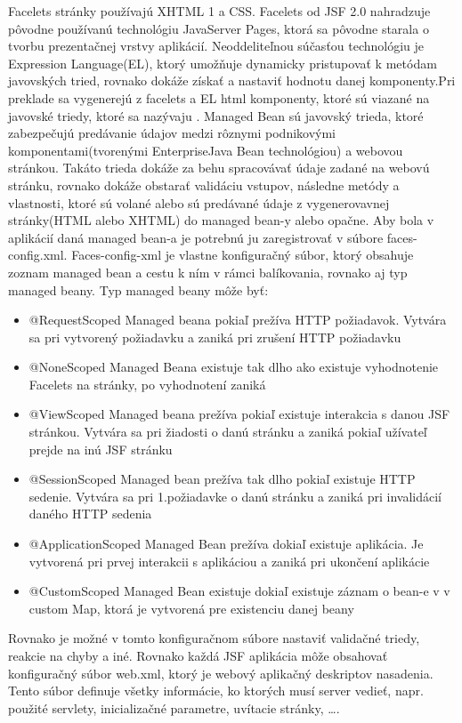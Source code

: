 Facelets stránky používajú XHTML 1 a CSS. Facelets od JSF 2.0 nahradzuje pôvodne používanú technológiu JavaServer Pages, ktorá sa pôvodne starala o tvorbu prezentačnej vrstvy aplikácií. Neoddeliteľnou súčasťou technológiu je Expression Language(EL), ktorý umožňuje dynamicky pristupovať k metódam javovských tried, rovnako dokáže získať a nastaviť hodnotu danej komponenty.Pri preklade sa vygenerejú z facelets a EL html komponenty, ktoré sú viazané na javovské triedy, ktoré sa nazývaju . Managed Bean sú javovský trieda, ktoré zabezpečujú predávanie údajov medzi rôznymi podnikovými komponentami(tvorenými EnterpriseJava Bean technológiou) a webovou stránkou. Takáto trieda dokáže za behu spracovávať údaje zadané na webovú stránku, rovnako dokáže obstarať validáciu vstupov,  následne metódy a vlastnosti, ktoré sú volané alebo sú predávané údaje z vygenerovavnej stránky(HTML alebo XHTML) do managed bean-y alebo opačne. Aby bola v aplikácií  daná managed bean-a je potrebnú ju zaregistrovať v súbore faces-config.xml. Faces-config-xml je vlastne konfiguračný súbor, ktorý obsahuje zoznam managed bean a cestu k ním v rámci balíkovania, rovnako aj typ managed beany. Typ managed beany môže byť: 
\begin{itemize}
\item @RequestScoped Managed beana pokiaľ prežíva HTTP požiadavok. Vytvára sa pri vytvorený požiadavku a zaniká pri zrušení HTTP požiadavku
\item @NoneScoped Managed Beana existuje tak dlho ako existuje vyhodnotenie Facelets na stránky, po vyhodnotení zaniká
\item @ViewScoped Managed beana prežíva pokiaľ existuje interakcia s danou JSF stránkou. Vytvára sa pri žiadosti o danú stránku a zaniká pokiaľ užívateľ prejde na inú JSF stránku
\item @SessionScoped Managed bean prežíva tak dlho pokiaľ existuje HTTP sedenie. Vytvára sa pri 1.požiadavke o danú stránku a zaniká pri invalidácií daného HTTP sedenia
\item @ApplicationScoped Managed Bean prežíva dokiaľ existuje aplikácia. Je vytvorená pri prvej interakcii s aplikáciou a zaniká pri ukončení aplikácie
\item @CustomScoped Managed Bean existuje dokiaľ existuje záznam o bean-e v v custom Map, ktorá je vytvorená pre existenciu danej beany
\end{itemize}
Rovnako je možné v tomto konfiguračnom súbore nastaviť validačné triedy, reakcie na chyby a iné. Rovnako každá JSF aplikácia môže obsahovať konfiguračný súbor web.xml, ktorý je webový aplikačný deskriptov nasadenia. Tento súbor definuje všetky informácie, ko ktorých musí server vedieť, napr. použité servlety, inicializačné parametre, uvítacie stránky, \ldots.
